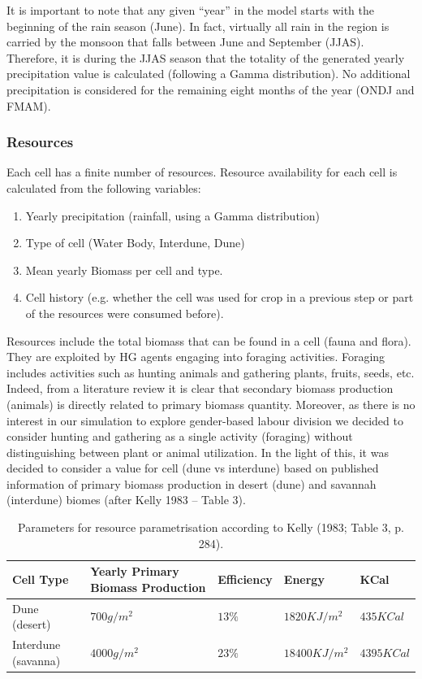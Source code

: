 \documentclass[11pt,oneside,a4paper,openright]{report}
\begin{document}
It is important to note that any given “year” in the model starts with the beginning of the rain season
(June). In fact, virtually all rain in the region is carried by the monsoon that falls between June and
September (JJAS). Therefore, it is during the JJAS season that the totality of the generated yearly
precipitation value is calculated (following a Gamma distribution). No additional precipitation is
considered for the remaining eight months of the year (ONDJ and FMAM).

\subsubsection{Resources}

Each cell has a finite number of resources. Resource availability for each cell is calculated from the
following variables:

\begin{enumerate}
\item Yearly precipitation (rainfall, using a Gamma distribution)
\item Type of cell (Water Body, Interdune, Dune)
\item Mean yearly Biomass per cell and type.
\item Cell history (e.g. whether the cell was used for crop in a previous step or part of the resources
were consumed before).
\end{enumerate}

Resources include the total biomass that can be found in a cell (fauna and flora). They are exploited
by HG agents engaging into foraging activities. Foraging includes activities such as hunting animals
and gathering plants, fruits, seeds, etc. Indeed, from a literature review it is clear that secondary
biomass production (animals) is directly related to primary biomass quantity. Moreover, as there is no
interest in our simulation to explore gender-based labour division we decided to consider hunting and
gathering as a single activity (foraging) without distinguishing between plant or animal utilization. In the
light of this, it was decided to consider a value for cell (dune vs interdune) based on published
information of primary biomass production in desert (dune) and savannah (interdune) biomes (after
Kelly 1983 – Table 3).


\begin{table}[ht!]
\centering	
	\begin{tabular}[c]{|l|l|l|l|l|}
	\hline
	Cell Type & Yearly Primary Biomass Production & Efficiency & Energy & KCal \\
	\hline
	Dune (desert) & $700g/m^2$ & $13\%$ & $1820KJ/m^2$ & $435KCal$ \\ 
	\hline
	Interdune (savanna) & $4000g/m^2$ & $23\%$ & $18400KJ/m^2$ & $4395KCal$ \\
	\hline
	\end{tabular}
	\caption{Parameters for resource parametrisation according to Kelly (1983; Table 3, p. 284).}
	\label{tab:tabResources}
\end{table}
\end{document}
